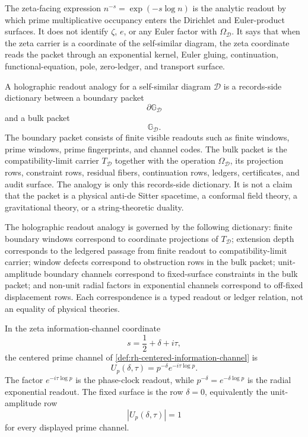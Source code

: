 \begin{principle}
\label{prin:zeta-readout-boundary}
The zeta-facing expression $n^{-s}=\exp(-s\log n)$ is the analytic
readout by which prime multiplicative occupancy enters the Dirichlet and
Euler-product surfaces. It does not identify $\zeta$, $e$, or any Euler
factor with $\Omega_{\mathcal D}$. It says that when the zeta carrier is a
coordinate of the self-similar diagram, the zeta coordinate reads the
packet through an exponential kernel, Euler gluing, continuation,
functional-equation, pole, zero-ledger, and transport surface.
\end{principle}

\begin{definition}
\label{def:holographic-readout-analogy}
A holographic readout analogy for a self-similar diagram $\mathcal D$ is a
records-side dictionary between a boundary packet
$$
\partial\mathbb G_{\mathcal D}
$$
and a bulk packet
$$
\mathbb G_{\mathcal D}.
$$
The boundary packet consists of finite visible readouts such as finite
windows, prime windows, prime fingerprints, and channel codes. The bulk
packet is the compatibility-limit carrier $T_{\mathcal D}$ together with
the operation $\Omega_{\mathcal D}$, its projection rows, constraint
rows, residual fibers, continuation rows, ledgers, certificates, and audit
surface. The analogy is only this records-side dictionary. It is not a
claim that the packet is a physical anti-de Sitter spacetime, a conformal
field theory, a gravitational theory, or a string-theoretic duality.
\end{definition}

\begin{principle}
\label{prin:boundary-bulk-readout-dictionary}
The holographic readout analogy is governed by the following dictionary:
finite boundary windows correspond to coordinate projections of
$T_{\mathcal D}$; extension depth corresponds to the ledgered passage from
finite readout to compatibility-limit carrier; window defects correspond
to obstruction rows in the bulk packet; unit-amplitude boundary channels
correspond to fixed-surface constraints in the bulk packet; and
non-unit radial factors in exponential channels correspond to off-fixed
displacement rows. Each correspondence is a typed readout or ledger
relation, not an equality of physical theories.
\end{principle}

\begin{definition}
\label{def:zeta-radial-phase-coordinates}
In the zeta information-channel coordinate
$$
s=\frac{1}{2}+\delta+i\tau,
$$
the centered prime channel of
\autoref{def:rh-centered-information-channel} is
$$
U_p(\delta,\tau)=p^{-\delta}e^{-i\tau\log p}.
$$
The factor $e^{-i\tau\log p}$ is the phase-clock readout, while
$p^{-\delta}=e^{-\delta\log p}$ is the radial exponential readout. The
fixed surface is the row $\delta=0$, equivalently the unit-amplitude row
$$
|U_p(\delta,\tau)|=1
$$
for every displayed prime channel.
\end{definition}


